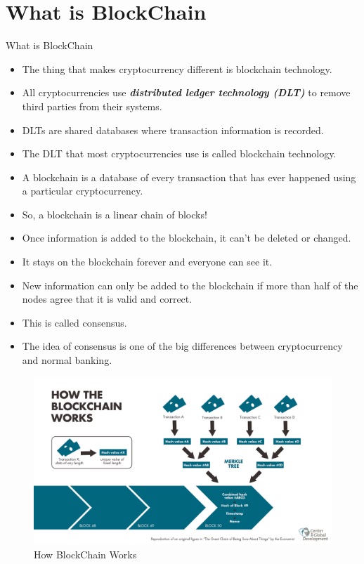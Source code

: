 \documentclass{beamer}
\begin{document}
\section{What is BlockChain}

\begin{frame}{What is BlockChain}
    \begin{itemize}
        \item The thing that makes cryptocurrency different is blockchain technology.
        \item All cryptocurrencies use \textit{\textbf{ distributed ledger technology (DLT)}} to remove third parties from their systems. 
        \item DLTs are shared databases where transaction information is recorded.
        \item The DLT that most cryptocurrencies use is called blockchain technology.
        \item A blockchain is a database of every transaction that has ever happened using a particular cryptocurrency.
    \end{itemize}
\end{frame}

\begin{frame}{}
    \begin{itemize}
        \item So, a blockchain is a linear chain of blocks! 
        \item Once information is added to the blockchain, it can’t be deleted or changed.
        \item It stays on the blockchain forever and everyone can see it.
        \item New information can only be added to the blockchain if more than half of the nodes agree that it is valid and correct.
        \item This is called consensus.
        \item The idea of consensus is one of the big differences between cryptocurrency and normal banking.
    \end{itemize}
\end{frame}

\begin{frame}{}
     \begin{figure}
    \includegraphics[width=1\textwidth]{blockchain.png}
    \caption{How BlockChain Works}
\end{figure}
\end{frame}
\end{document}
